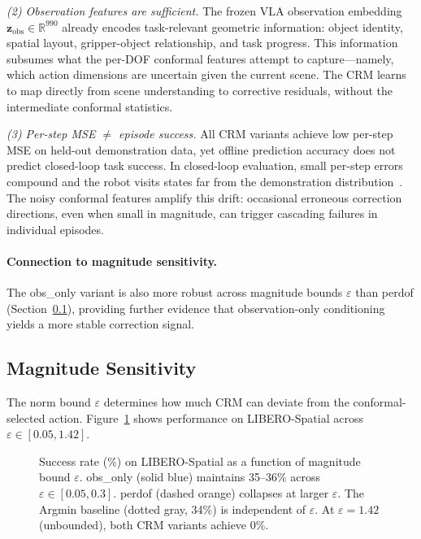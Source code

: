 \emph{(2) Observation features are sufficient.}
The frozen VLA observation embedding $\mathbf{z}_{\mathrm{obs}} \in \mathbb{R}^{990}$ already encodes task-relevant geometric information: object identity, spatial layout, gripper-object relationship, and task progress.
This information subsumes what the per-DOF conformal features attempt to capture---namely, which action dimensions are uncertain given the current scene.
The CRM learns to map directly from scene understanding to corrective residuals, without the intermediate conformal statistics.

\emph{(3) Per-step MSE $\neq$ episode success.}
All CRM variants achieve low per-step MSE on held-out demonstration data, yet offline prediction accuracy does not predict closed-loop task success.
In closed-loop evaluation, small per-step errors compound and the robot visits states far from the demonstration distribution~\cite{ross2011dagger}.
The noisy conformal features amplify this drift: occasional erroneous correction directions, even when small in magnitude, can trigger cascading failures in individual episodes.

\paragraph{Connection to magnitude sensitivity.}
The obs\_only variant is also more robust across magnitude bounds $\varepsilon$ than perdof (Section~\ref{sec:magnitude_results}), providing further evidence that observation-only conditioning yields a more stable correction signal.


\subsection{Magnitude Sensitivity}
\label{sec:magnitude_results}

The norm bound $\varepsilon$ determines how much CRM can deviate from the conformal-selected action.
Figure~\ref{fig:magnitude} shows performance on LIBERO-Spatial across $\varepsilon \in [0.05, 1.42]$.

\begin{figure}[t]
\centering
\caption{Success rate (\%) on LIBERO-Spatial as a function of magnitude bound $\varepsilon$. obs\_only (solid blue) maintains 35--36\% across $\varepsilon \in [0.05, 0.3]$. perdof (dashed orange) collapses at larger $\varepsilon$. The Argmin baseline (dotted gray, 34\%) is independent of $\varepsilon$. At $\varepsilon{=}1.42$ (unbounded), both CRM variants achieve 0\%.}
\label{fig:magnitude}
\end{figure}

